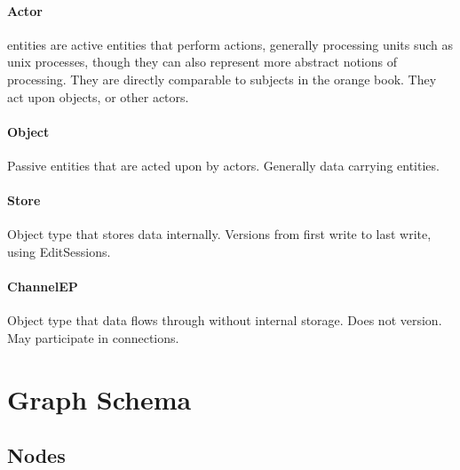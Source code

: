 \documentclass[12pt,twoside,openright,a4paper]{article}
\begin{document}
\paragraph{Actor}
\label{sec:ty:actor}
 entities are active entities that perform actions, generally processing units such as unix processes, though they can also represent more abstract notions of processing. They are directly comparable to subjects in the orange book. They act upon objects, or other actors.

\paragraph{Object}
Passive entities that are acted upon by actors. Generally data carrying entities.

\paragraph{Store}
Object type that stores data internally. Versions from first write to last write, using EditSessions.

\paragraph{ChannelEP}
Object type that data flows through without internal storage. Does not version. May participate in connections.

\section{Graph Schema}

\subsection{Nodes}
\end{document}
